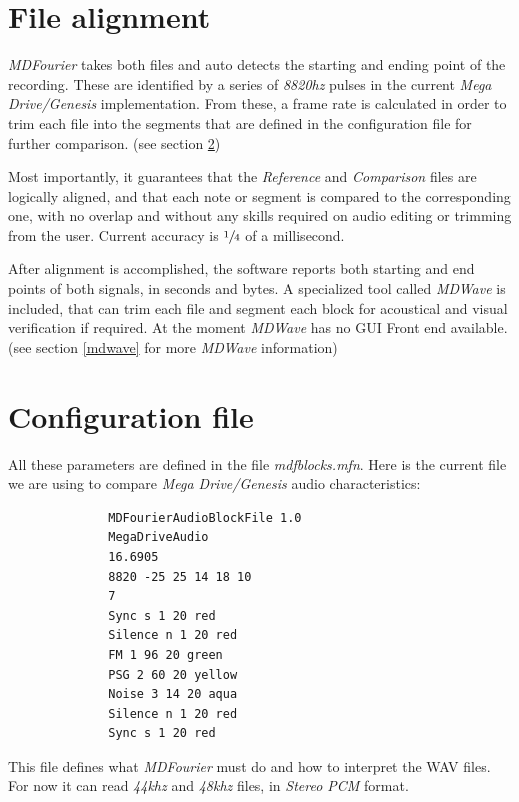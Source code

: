 \documentclass[10pt,a4paper]{report}
\begin{document}
\section{File alignment}

\textit{MDFourier} takes both files and auto detects the starting and ending point of the recording. These are identified by a series of \textit{8820hz} pulses in the current \textit{Mega Drive/Genesis} implementation. From these, a frame rate is calculated in order to trim each file into the segments that are defined in the configuration file for further comparison. (see section \ref{mfnconfig})

Most importantly, it guarantees that the \textit{Reference} and \textit{Comparison} files are logically aligned, and that each note or segment is compared to the corresponding one, with no overlap and without any skills required on audio editing or trimming from the user. Current accuracy is $\sfrac{1}{4}$ of a millisecond.

After alignment is accomplished, the software reports both starting and end points of both signals, in seconds and bytes. A specialized tool called \textit{MDWave} is included, that can trim each file and segment each block for acoustical and visual verification if required. At the moment \textit{MDWave} has no GUI Front end available. (see section \ref{mdwave} for more \textit{MDWave} information) 

\section{Configuration file}
\label{mfnconfig}

All these parameters are defined in the file \textit{mdfblocks.mfn}. Here is the current file we are using to compare \textit{Mega Drive/Genesis} audio characteristics:

\begin{verbatim}
              MDFourierAudioBlockFile 1.0
              MegaDriveAudio
              16.6905
              8820 -25 25 14 18 10
              7
              Sync s 1 20 red
              Silence n 1 20 red
              FM 1 96 20 green
              PSG 2 60 20 yellow
              Noise 3 14 20 aqua
              Silence n 1 20 red
              Sync s 1 20 red
\end{verbatim}

This file defines what \textit{MDFourier} must do and how to interpret the WAV files. For now it can read \textit{44khz} and \textit{48khz} files, in \textit{Stereo PCM} format.
\end{document}
